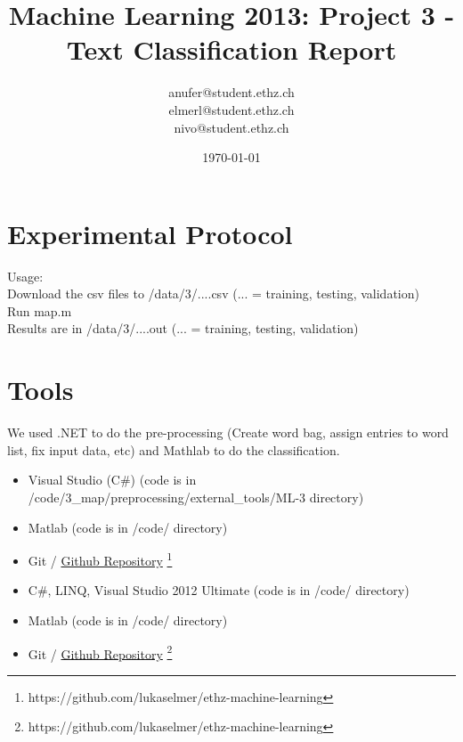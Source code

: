 \documentclass[a4paper, 11pt]{article}
\title{Machine Learning 2013: Project 3 - Text Classification Report}
\author{anufer@student.ethz.ch\\ elmerl@student.ethz.ch\\ nivo@student.ethz.ch\\}
\date{\today}
\begin{document}
\maketitle

\section*{Experimental Protocol}
Usage:\\
Download the csv files to /data/3/....csv (... = training, testing, validation)\\
Run map.m \\
Results are in /data/3/....out (... = training, testing, validation)










\section{Tools}
We used .NET to do the pre-processing (Create word bag, assign entries to word list, fix input data, etc) and Mathlab to do the classification.

\begin{itemize}
\item Visual Studio (C\#) (code is in /code/3\_map/preprocessing/external\_tools/ML-3 directory)
\item Matlab (code is in /code/ directory)
\item Git / \href{https://github.com/lukaselmer/ethz-machine-learning}{Github Repository} \footnote{https://github.com/lukaselmer/ethz-machine-learning}
\end{itemize}
\begin{itemize}
\item C\#, LINQ, Visual Studio 2012 Ultimate (code is in /code/ directory)
\item Matlab (code is in /code/ directory)
\item Git / \href{https://github.com/lukaselmer/ethz-machine-learning}{Github Repository} \footnote{https://github.com/lukaselmer/ethz-machine-learning}
\end{itemize}
\end{document}
